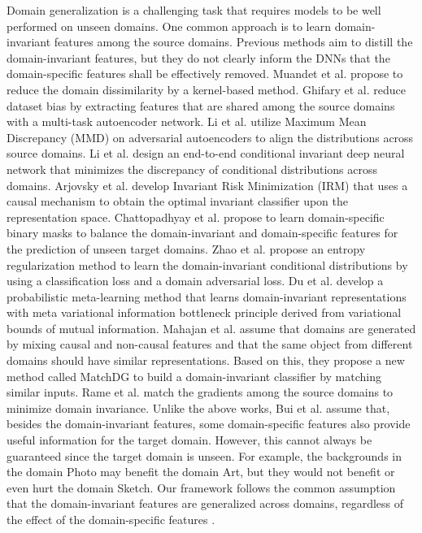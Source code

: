 \documentclass{article}
\begin{document}
Domain generalization is a challenging task that requires models to be well performed on unseen domains.
One common approach is to learn domain-invariant features among the source domains. Previous methods aim to distill the domain-invariant features, but they do not clearly inform the DNNs that the domain-specific features shall be effectively removed. Muandet et al. \cite{muandet2013domain} propose to reduce the domain dissimilarity by a kernel-based method. Ghifary et al. \cite{ghifary2015domain} reduce dataset bias by extracting features that are shared among the source domains with a multi-task autoencoder network. Li et al. \cite{li2018domain} utilize Maximum Mean Discrepancy (MMD) on adversarial autoencoders to align the distributions across source domains. Li et al. \cite{li2018deep} design an end-to-end conditional invariant deep neural network that minimizes the discrepancy of conditional distributions across domains. Arjovsky et al. \cite{arjovsky2019invariant} develop Invariant Risk Minimization (IRM) that uses a causal mechanism to obtain the optimal invariant classifier upon the representation space. Chattopadhyay et al. \cite{chattopadhyay2020learning} propose to learn domain-specific binary masks to balance the domain-invariant and domain-specific features for the prediction of unseen target domains. Zhao et al. \cite{zhao2020domain} propose an entropy regularization method to learn the domain-invariant conditional distributions by using a classification loss and a domain adversarial loss. Du et al. \cite{du2020learning} develop a probabilistic meta-learning method that learns domain-invariant representations with meta variational information bottleneck principle derived from variational bounds of mutual information. Mahajan et al. \cite{mahajan2021domain} assume that domains are generated by mixing causal and non-causal features and that the same object from different domains should have similar representations. Based on this, they propose a new method called MatchDG to build a domain-invariant classifier by matching similar inputs. Rame et al. \cite{rame2022fishr} match the gradients among the source domains to minimize domain invariance.  Unlike the above works, Bui et al. \cite{bui2021exploiting} assume that, besides the domain-invariant features, some domain-specific features also provide useful information for the target domain. However, this cannot always be guaranteed since the target domain is unseen. For example, the backgrounds in the domain Photo may benefit the domain Art, but they would not benefit or even hurt the domain Sketch. Our framework follows the common assumption that the domain-invariant features are generalized across domains, regardless of the effect of the domain-specific features \cite{li2018deep,arjovsky2019invariant,zhao2020domain}.
\end{document}
